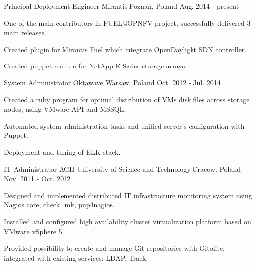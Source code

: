 

\begin{cventries}

  \cventry
    {Principal Deployment Engineer} %
    {Mirantis} %
    {Poznań, Poland} %
    {Aug. 2014 - present} %
    {
      \begin{cvitems} %
        \item {One of the main contributors in FUEL@OPNFV project, successfully delivered 3 main releases.}
        \item {Created plugin for Mirantis Fuel which integrate OpenDaylight SDN controller.}
        \item {Created puppet module for NetApp E-Series storage arrays.}
      \end{cvitems}
    }

  \cventry
    {System Administrator} %
    {Oktawave} %
    {Warsaw, Poland} %
    {Oct. 2012 - Jul. 2014} %
    {
      \begin{cvitems} %
        \item {Created a ruby program for optimal distribution of VMs disk files across storage nodes, using VMware API and MSSQL.}
        \item {Automated system administration tasks and unified server's configuration with Puppet.}
        \item {Deployment and tuning of ELK stack.}
      \end{cvitems}
    }

  \cventry
    {IT Administrator} %
    {AGH University of Science and Technology} %
    {Cracow, Poland} %
    {Nov. 2011 - Oct. 2012} %
    {
      \begin{cvitems} %
        \item {Designed and implemented distributed IT infrastructure monitoring system using Nagios core, check\_mk, pnp4nagios.}
        \item {Installed and configured high availability cluster virtualization platform based on VMware vSphere 5.}
        \item {Provided possibility to create and manage Git repositories with Gitolite, integrated with existing services: LDAP, Track.}
      \end{cvitems}
    }


\end{cventries}
